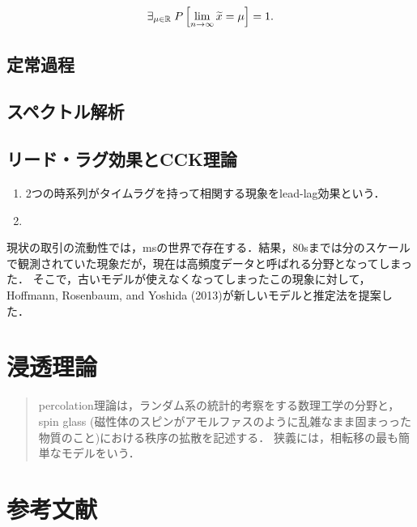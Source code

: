 \documentclass[uplatex,dvipdfmx]{jsreport}
\begin{document}
\begin{definition}
    \[\exists_{\mu\in\mathbb{R}}\;P\left[\lim_{n\to\infty}\widetilde{x}=\mu\right]=1.\]
\end{definition}

\section{定常過程}

\section{スペクトル解析}



\section{リード・ラグ効果とCCK理論}

\begin{definition}\mbox{}
    \begin{enumerate}
        \item 2つの時系列がタイムラグを持って相関する現象をlead-lag効果という．
        \item 
    \end{enumerate}
\end{definition}
\begin{remarks}
    現状の取引の流動性では，msの世界で存在する．結果，80sまでは分のスケールで観測されていた現象だが，現在は高頻度データと呼ばれる分野となってしまった．
    そこで，古いモデルが使えなくなってしまったこの現象に対して，Hoffmann, Rosenbaum, and Yoshida (2013)が新しいモデルと推定法を提案した．
    
\end{remarks}

\chapter{浸透理論}

\begin{quotation}
    percolation理論は，ランダム系の統計的考察をする数理工学の分野と，spin glass (磁性体のスピンがアモルファスのように乱雑なまま固まっった物質のこと)における秩序の拡散を記述する．
    狭義には，相転移の最も簡単なモデルをいう．
\end{quotation}

\chapter{参考文献}
\end{document}
